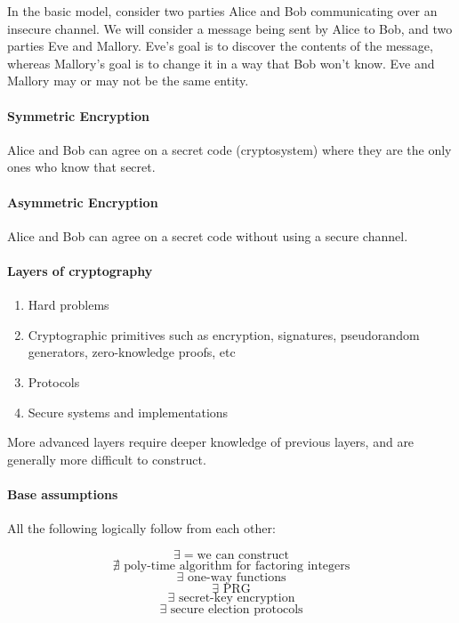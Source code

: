 \documentclass{idc_msc}
\begin{document}
In the basic model, consider two parties Alice and Bob communicating over an insecure channel.
We will consider a message being sent by Alice to Bob, and two parties Eve and Mallory.
Eve's goal is to discover the contents of the message, whereas Mallory's goal is to change it in a way that Bob won't know.
Eve and Mallory may or may not be the same entity.

\paragraph{Symmetric Encryption}

Alice and Bob can agree on a secret code (cryptosystem) where they are the only ones who know that secret.

\paragraph{Asymmetric Encryption}

Alice and Bob can agree on a secret code without using a secure channel.

\paragraph{Layers of cryptography}

\begin{enumerate}
  \item Hard problems
  \item Cryptographic primitives such as encryption, signatures, pseudorandom generators, zero-knowledge proofs, etc
  \item Protocols
  \item Secure systems and implementations
\end{enumerate}

More advanced layers require deeper knowledge of previous layers, and are generally more difficult to construct.

\paragraph{Base assumptions}

All the following logically follow from each other:

\[
  \exists =\text{we can construct}
\]
\[
  \nexists \text{ poly-time algorithm for factoring integers}
\]
\[
  \exists \text{ one-way functions}
\]
\[
  \exists \text{ PRG}
\]
\[
  \exists \text{ secret-key encryption}
\]
\[
  \exists \text{ secure election protocols}
\]
\end{document}
